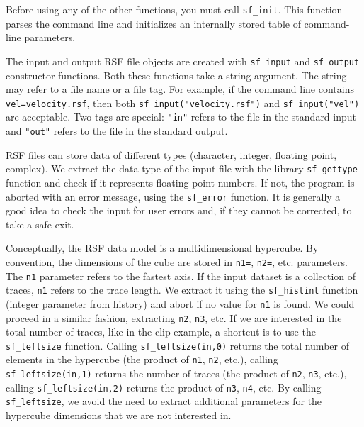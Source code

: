 
Before using any of the other functions, you must call
\texttt{sf\_init}. This function parses the command line and
initializes an internally stored table of command-line parameters.


The input and output RSF file objects are created with \texttt{sf\_input} and
\texttt{sf\_output} constructor functions. Both these functions take a string
argument. The string may refer to a file name or a file tag. For example, if
the command line contains \texttt{vel=velocity.rsf}, then both
\texttt{sf\_input("velocity.rsf")} and \texttt{sf\_input("vel")} are
acceptable. Two tags are special: \texttt{"in"} refers to the file in the
standard input and \texttt{"out"} refers to the file in the standard
output. 

 
RSF files can store data of different types (character, integer,
floating point, complex). We extract the data type of the input file
with the library \texttt{sf\_gettype} function and check if it
represents floating point numbers. If not, the program is aborted with
an error message, using the \texttt{sf\_error} function.  It is
generally a good idea to check the input for user errors and, if they
cannot be corrected, to take a safe exit.


Conceptually, the RSF data model is a multidimensional hypercube. By
convention, the dimensions of the cube are stored in \texttt{n1=},
\texttt{n2=}, etc. parameters. The \texttt{n1} parameter refers to the
fastest axis. If the input dataset is a collection of traces,
\texttt{n1} refers to the trace length. We extract it using the
\texttt{sf\_histint} function (integer parameter from history) and
abort if no value for \texttt{n1} is found. We could proceed in a
similar fashion, extracting \texttt{n2}, \texttt{n3}, etc. If we are
interested in the total number of traces, like in the clip example, a
shortcut is to use the \texttt{sf\_leftsize} function. Calling
\texttt{sf\_leftsize(in,0)} returns the total number of elements in
the hypercube (the product of \texttt{n1}, \texttt{n2}, etc.), calling
\texttt{sf\_leftsize(in,1)} returns the number of traces (the product
of \texttt{n2}, \texttt{n3}, etc.), calling
\texttt{sf\_leftsize(in,2)} returns the product of \texttt{n3},
\texttt{n4}, etc. By calling \texttt{sf\_leftsize}, we avoid the need
to extract additional parameters for the hypercube dimensions that we
are not interested in.

